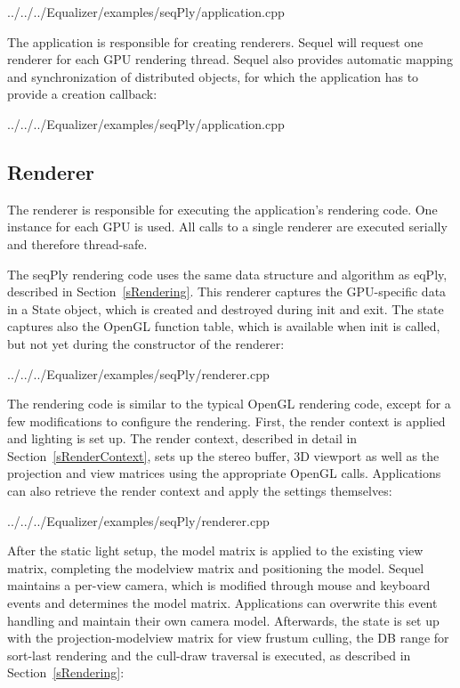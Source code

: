 \documentclass[10pt,a4]{scrartcl}
\newcommand{\sref}[1]{Section~\ref{#1}}
\begin{document}
{\footnotesize
  {../../../Equalizer/examples/seqPly/application.cpp}}

The application is responsible for creating renderers. Sequel will request one
renderer for each GPU rendering thread. Sequel also provides automatic mapping
and synchronization of distributed objects, for which the application has to
provide a creation callback:

{\footnotesize
  {../../../Equalizer/examples/seqPly/application.cpp}}


\subsection{Renderer}

The renderer is responsible for executing the application's rendering code. One
instance for each GPU is used. All calls to a single renderer are executed
serially and therefore thread-safe.

The \textsf{seqPly} rendering code uses the same data structure and algorithm as
\textsf{eqPly}, described in \sref{sRendering}. This renderer captures the
GPU-specific data in a \textsf{State} object, which is created and destroyed
during init and exit. The state captures also the OpenGL function table, which
is available when init is called, but not yet during the constructor of the
renderer:

{\footnotesize
  {../../../Equalizer/examples/seqPly/renderer.cpp}}

The rendering code is similar to the typical OpenGL rendering code, except for a
few modifications to configure the rendering. First, the render context is
applied and lighting is set up. The render context, described in detail in
\sref{sRenderContext}, sets up the stereo buffer, 3D viewport as well as the
projection and view matrices using the appropriate OpenGL calls. Applications
can also retrieve the render context and apply the settings themselves:

{\footnotesize
  {../../../Equalizer/examples/seqPly/renderer.cpp}}

After the static light setup, the model matrix is applied to the existing view
matrix, completing the modelview matrix and positioning the model. Sequel
maintains a per-view camera, which is modified through mouse and keyboard events
and determines the model matrix. Applications can overwrite this event handling
and maintain their own camera model. Afterwards, the state is set up with the
projection-modelview matrix for view frustum culling, the DB range for sort-last
rendering and the cull-draw traversal is executed, as described in
\sref{sRendering}:
\end{document}
